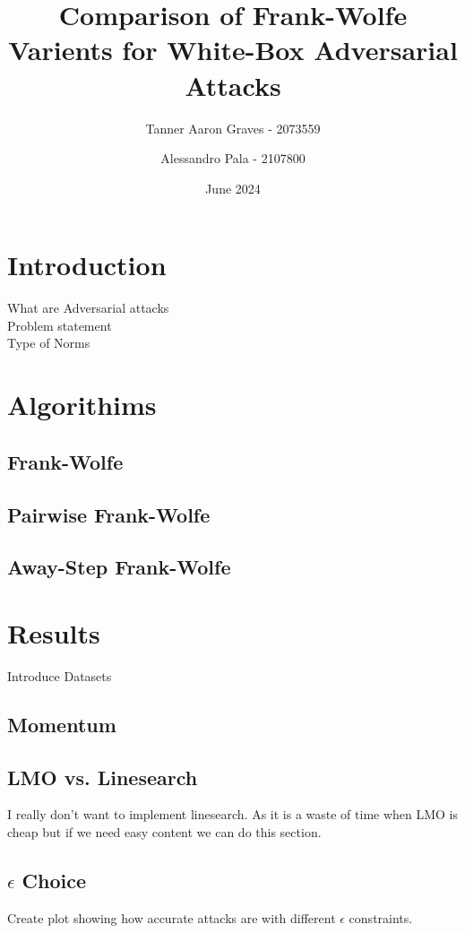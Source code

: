 \documentclass{article}
\title{Comparison of Frank-Wolfe Varients for White-Box Adversarial Attacks}
\author{Tanner Aaron Graves - 2073559\and Alessandro Pala - 2107800}
\date{June 2024}
\begin{document}
\maketitle

\section{Introduction}
What are Adversarial attacks\\
Problem statement\\
Type of Norms

\section{Algorithims}
\subsection{Frank-Wolfe}

\subsection{Pairwise Frank-Wolfe}
\subsection{Away-Step Frank-Wolfe}
\section{Results}
Introduce Datasets
\subsection{Momentum}
\subsection{LMO vs. Linesearch}
I really don't want to implement linesearch. As it is a waste of time when LMO is cheap but if we need easy content we can do this section.
\subsection{$\epsilon$ Choice}
Create plot showing how accurate attacks are with different $\epsilon$ constraints.
\end{document}
